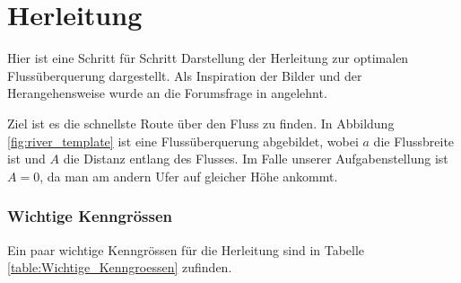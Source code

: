 %
%
%
%
\section{Herleitung
\label{schwimmen:section:naiver_weg}}

Hier ist eine Schritt für Schritt Darstellung der Herleitung zur
optimalen Flussüberquerung dargestellt. Als Inspiration der Bilder
und der Herangehensweise wurde an die Forumsfrage in
\cite{schwimmen:mathForum} angelehnt.



Ziel ist es die schnellste Route über den Fluss zu finden. In
Abbildung \ref{fig:river_template} ist eine Flussüberquerung
abgebildet, wobei \(a\) die Flussbreite ist und \(A\) die Distanz
entlang des Flusses. Im Falle unserer Aufgabenstellung ist \(A=0\),
da man am andern Ufer auf gleicher Höhe ankommt.

\subsubsection{Wichtige Kenngrössen}
Ein paar wichtige Kenngrössen für die Herleitung sind in Tabelle \ref{table:Wichtige_Kenngroessen} zufinden.

